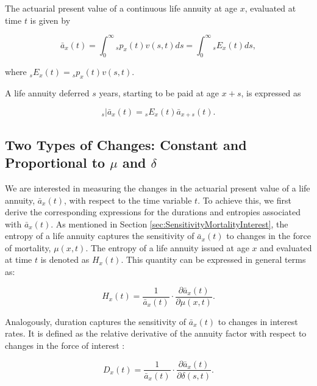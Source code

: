 \documentclass[12pt]{article}
\begin{document}
The actuarial present value of a continuous life annuity at age $x$, evaluated at time $t$ is given by

\begin{equation}\label{eq:Annuity}
\bar{a}_x(t) = \int_0^\infty {}_sp_x(t) {v}(s,t)ds = \int_0^\infty {}_sE_x(t) ds,
\end{equation}

where ${}_sE_x(t)={}_sp_x(t) {v}(s,t)$. 

A life annuity deferred $s$ years, starting to be paid at age $x+s$, is expressed as

\begin{equation}\label{eq:DefAnnuity}
{}_s|\bar{a}_x(t) = {}_sE_x(t) \bar{a}_{x+s}(t).
\end{equation}


\subsection{Two Types of Changes: Constant and Proportional to $\mu$ and $\delta$}


We are interested in measuring the changes in the actuarial present value of a life annuity, \( \bar{a}_x(t) \), with respect to the time variable \( t \). To achieve this, we first derive the corresponding expressions for the durations and entropies associated with \( \bar{a}_x(t) \). As mentioned in Section \ref{sec:SensitivityMortalityInterest}, the entropy of a life annuity captures the sensitivity of \( \bar{a}_x(t) \) to changes in the force of mortality, \( \mu(x,t) \). The entropy of a life annuity issued at age \( x \) and evaluated at time \( t \) is denoted as \( H_x(t) \). This quantity can be expressed in general terms as:

\begin{equation}\label{eq:EntropyGeneral}
{H}_{x}(t) = \frac{ 1}{\bar{a}_x(t)}\cdot \frac{\partial \bar{a}_x(t) }{\partial \mu(x,t)}.
\end{equation}

Analogously, duration captures the sensitivity of $\bar{a}_x(t)$ to changes in interest rates. It is defined as the relative derivative of the annuity factor with respect to changes in the force of interest \citep{Milevsky2012,Milevsky2012a}:


\begin{equation}\label{eq:DurationGeneral}
{D}_{x}(t) = \frac{1}{\bar{a}_x(t)}\cdot  \frac{\partial \bar{a}_x(t) }{\partial \delta(s,t)}.
\end{equation}
\end{document}
